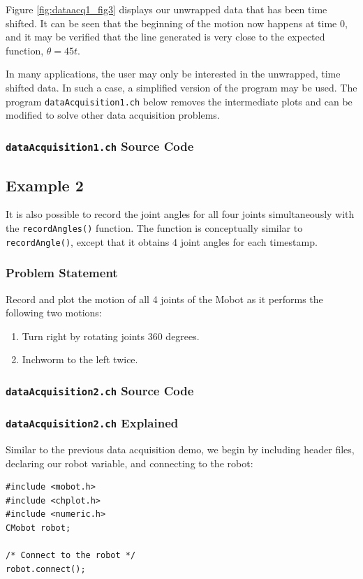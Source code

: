 \documentclass{article}
\begin{document}
Figure \ref{fig:dataacq1_fig3}  displays our unwrapped data that has been time shifted. It can be seen
that the beginning of the motion now happens at time 0, and it may be verified that the
line generated is very close to the expected function, $\theta = 45 t$.

In many applications, the user may only be interested in the unwrapped, time shifted data. 
In such a case, a simplified version of the program may be used. The program 
\texttt{dataAcquisition1.ch} below removes the intermediate plots and can be modified
to solve other data acquisition problems.

\subsubsection{\texttt{dataAcquisition1.ch} Source Code}


\subsection{Example 2}
It is also possible to record the joint angles for all four joints simultaneously
with the \texttt{recordAngles()} function. The function is conceptually similar
to \texttt{recordAngle()}, except that it obtains 4 joint angles for each timestamp.

\subsubsection{Problem Statement}
Record and plot the motion of all 4 joints of the Mobot as it performs the
following two motions:
\begin{enumerate}
\item Turn right by rotating joints 360 degrees.
\item Inchworm to the left twice.
\end{enumerate}

\subsubsection{\texttt{dataAcquisition2.ch} Source Code}


\subsubsection{\texttt{dataAcquisition2.ch} Explained}
Similar to the previous data acquisition demo, we begin by including
header files, declaring our robot variable, and connecting to the robot:
\begin{verbatim}
#include <mobot.h>
#include <chplot.h>
#include <numeric.h>
CMobot robot;

/* Connect to the robot */
robot.connect();
\end{verbatim}
\end{document}
